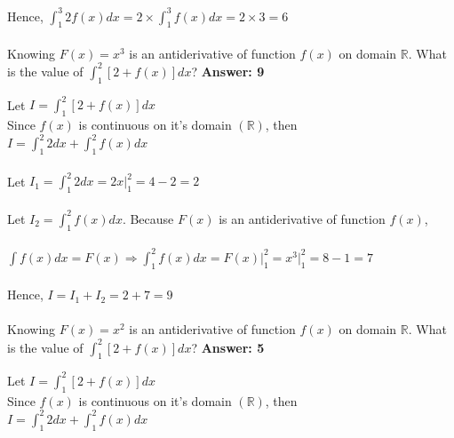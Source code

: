 \documentclass{article}
\begin{document}
    Hence, $\displaystyle \int_{1}^{3} 2f(x) dx = 2\times\int_{1}^{3} f(x) dx = 2 \times 3 = 6$

    \paragraph{\cite{26@116}} Knowing $\displaystyle F(x) = x^3$ is an antiderivative of function $\displaystyle f(x)$ on domain $\displaystyle \mathbb{R}$. What is the value of $\displaystyle \int_{1}^{2} [2 + f(x)] dx$? \textbf{Answer: 9}

    Let $\displaystyle I = \int_{1}^{2} [2 + f(x)] dx$\\

    Since $f(x)$ is continuous on it's domain $(\mathbb{R})$, then\\

    $\displaystyle I = \int_{1}^{2} 2 dx + \int_{1}^{2} f(x) dx$\\\\

    Let $\displaystyle I_1 = \int_{1}^{2} 2 dx = 2x\big|_1^2 = 4 - 2 = 2$\\\\

    Let $\displaystyle I_2 = \int_{1}^{2} f(x) dx$. Because $F(x)$ is an antiderivative of function $f(x)$,\\\\

    $\displaystyle \int f(x) dx = F(x) \Rightarrow \int_{1}^{2} f(x) dx = F(x)\big|_1^2 = x^3\big|_1^2 = 8 - 1 = 7$\\\\

    Hence, $\displaystyle I = I_1 + I_2 = 2 + 7 = 9$

    \paragraph{\cite{32@109}} Knowing $\displaystyle F(x) = x^2$ is an antiderivative of function $\displaystyle f(x)$ on domain $\displaystyle \mathbb{R}$. What is the value of $\displaystyle \int_{1}^{2} [2 + f(x)] dx$? \textbf{Answer: 5}

    Let $\displaystyle I = \int_{1}^{2} [2 + f(x)] dx$\\

    Since $f(x)$ is continuous on it's domain $(\mathbb{R})$, then\\

    $\displaystyle I = \int_{1}^{2} 2 dx + \int_{1}^{2} f(x) dx$\\\\
\end{document}
